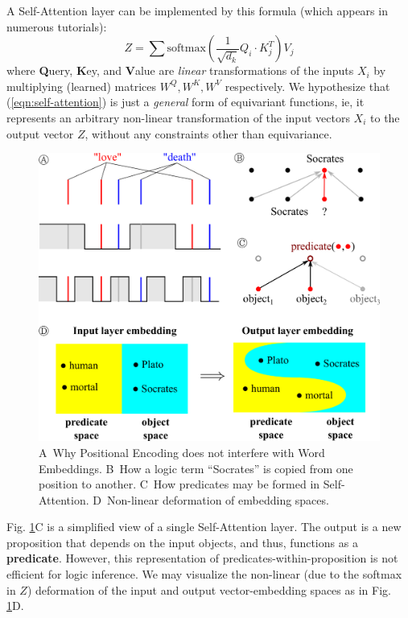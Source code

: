 \documentclass[orivec]{llncs}
\newcommand{\circA}{\textcircled{\scriptsize{A}} \,}
\newcommand{\circB}{\textcircled{\scriptsize{B}} \,}
\newcommand{\circC}{\textcircled{\scriptsize{C}} \,}
\newcommand{\circD}{\textcircled{\scriptsize{D}} \,}
\begin{document}
A Self-Attention layer can be implemented by this formula (which appears in numerous tutorials):
\begin{equation}
\label{eqn:self-attention}
Z = \sum \mathrm{softmax}(\frac{1}{\sqrt{d_k}} Q_i \cdot K_j^T) V_j
\end{equation}
where \textbf{Q}uery, \textbf{K}ey, and \textbf{V}alue are \textit{linear} transformations of the inputs $X_i$ by multiplying (learned) matrices $W^Q, W^K, W^V$ respectively.  We hypothesize that (\ref{eqn:self-attention}) is just a \textit{general} form of equivariant functions, ie, it represents an arbitrary non-linear transformation of the input vectors $X_i$ to the output vector $Z$, without any constraints other than equivariance.

\begin{figure}[h]
\centering
\includegraphics[scale=0.5]{embedding.png}
\caption{\circA Why Positional Encoding does not interfere with Word Embeddings. \circB How a logic term ``Socrates'' is copied from one position to another. \circC How predicates may be formed in Self-Attention. \circD Non-linear deformation of embedding spaces.}
\label{fig:embedding}
\end{figure}

Fig. \ref{fig:embedding}C is a simplified view of a single Self-Attention layer.  The output is a new proposition that depends on the input objects, and thus, functions as a \textbf{predicate}.  However, this representation of predicates-within-proposition is not efficient for logic inference.  We may visualize the non-linear (due to the softmax in $Z$) deformation of the input and output vector-embedding spaces as in Fig. \ref{fig:embedding}D.
\end{document}
